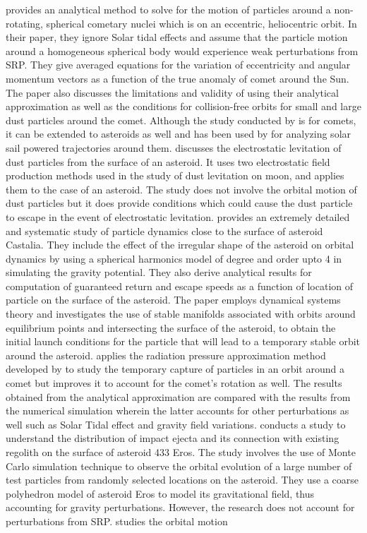 \cite{richter1995stability} provides an analytical method to solve for the motion of particles around a non-rotating, spherical cometary nuclei which is on an eccentric, heliocentric orbit. In their paper, they ignore Solar tidal effects and assume that the particle motion around a homogeneous spherical body would experience weak perturbations from \gls{SRP}. They give averaged equations for the variation of eccentricity and angular momentum vectors as a function of the true anomaly of comet around the Sun. The paper also discusses the limitations and validity of using their analytical approximation as well as the conditions for collision-free orbits for small and large dust particles around the comet. Although the study conducted by \cite{richter1995stability} is for comets, it can be extended to asteroids as well and has been used by \cite{morrow2001solar} for analyzing solar sail powered trajectories around them. \cite{lee1996dust} discusses the electrostatic levitation of dust particles from the surface of an asteroid. It uses two electrostatic field production methods used in the study of dust levitation on moon, and applies them to the case of an asteroid. The study does not involve the orbital motion of dust particles but it does provide conditions which could cause the dust particle to escape in the event of electrostatic levitation. \cite{scheeres1996orbits} provides an extremely detailed and systematic study of particle dynamics close to the surface of asteroid Castalia. They include the effect of the irregular shape of the asteroid on orbital dynamics by using a spherical harmonics model of degree and order upto 4 in simulating the gravity potential. They also derive analytical results for computation of guaranteed return and escape speeds as a function of location of particle on the surface of the asteroid. The paper employs dynamical systems theory and investigates the use of stable manifolds associated with orbits around equilibrium points and intersecting the surface of the asteroid, to obtain the initial launch conditions for the particle that will lead to a temporary stable orbit around the asteroid. \cite{scheeres2000ejecta} applies the radiation pressure approximation method developed by \cite{richter1995stability} to study the temporary capture of particles in an orbit around a comet but improves it to account for the comet's rotation as well. The results obtained from the analytical approximation are compared with the results from the numerical simulation wherein the latter accounts for other perturbations as well
such as Solar Tidal effect and gravity field variations. \cite{korycansky2004_impactEjecta} conducts a study to understand the distribution of impact ejecta and its connection with existing regolith on the surface of asteroid 433 Eros. The study involves the use of Monte Carlo simulation technique to observe the orbital evolution of a large number of test particles from randomly selected locations on the asteroid. They use a coarse polyhedron model of asteroid Eros to model its gravitational field, thus accounting for gravity perturbations. However, the research does not account for perturbations from \gls{SRP}. \cite{yarnoz2014passive} studies the orbital motion
